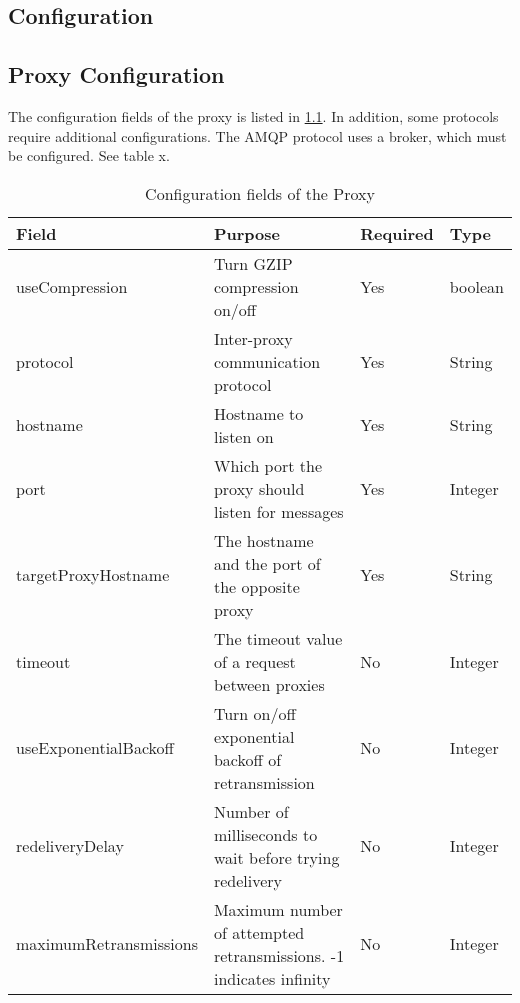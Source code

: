 \begin{appendices}

\chapter{Configuration}
\label{appendix-config}

\section{Proxy Configuration}

The configuration fields of the proxy is listed in \cref{appendix-table-config}.
In addition, some protocols require additional configurations. The AMQP protocol
uses a broker, which must be configured. See table x.


\begin{table}[h]
\begin{tabularx}{\textwidth}{|l|X|l|l|}
    \hline
    \textbf{Field}         & \textbf{Purpose}                                                   & \textbf{Required} & \textbf{Type} \\ \hline
    useCompression         & Turn GZIP compression on/off                                       & Yes               & boolean       \\ \hline
    protocol               & Inter-proxy communication protocol                                 & Yes               & String        \\ \hline
    hostname               & Hostname to listen on                                              & Yes               & String        \\ \hline
    port                   & Which port the proxy should listen for messages                    & Yes               & Integer       \\ \hline
    targetProxyHostname    & The hostname and the port of the opposite proxy                    & Yes               & String        \\ \hline
    timeout                & The timeout value of a request between proxies                     & No                & Integer       \\ \hline
    useExponentialBackoff  & Turn on/off exponential backoff of retransmission                 & No                & Integer       \\ \hline
    redeliveryDelay        & Number of milliseconds to wait before trying redelivery            & No                & Integer       \\ \hline
    maximumRetransmissions & Maximum number of attempted retransmissions. -1 indicates infinity & No                & Integer       \\ \hline
\end{tabularx}
\caption{Configuration fields of the Proxy}
\label{appendix-table-config}
\end{table}


\end{appendices}
